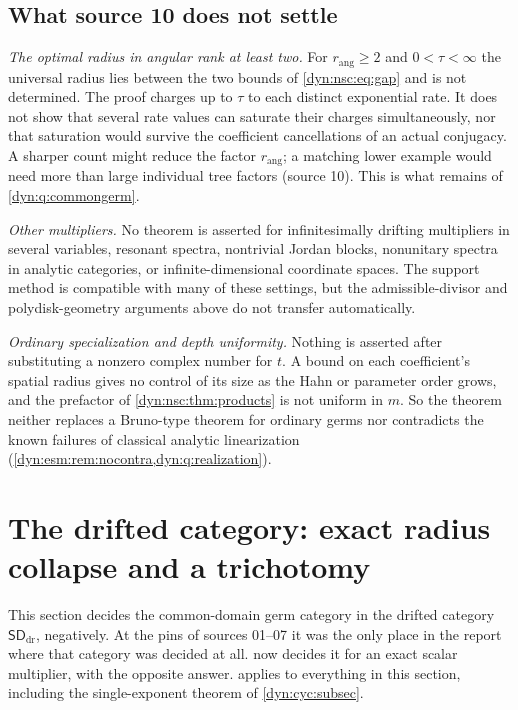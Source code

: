 \documentclass[11pt,letterpaper]{article}
\theoremstyle{definition}
\theoremstyle{remark}
\newcommand{\sddr}{\mathsf{SD}_{\mathrm{dr}}}
\newcommand{\rang}{r_{\mathrm{ang}}}
\numberwithin{equation}{section}
\begin{document}
\subsection{What source 10 does not settle}
\label{dyn:nsc:subsec:limits}

\emph{The optimal radius in angular rank at least two.} For $\rang\ge2$ and
$0<\tau<\infty$ the universal radius lies between the two bounds of
\eqref{dyn:nsc:eq:gap} and is not determined. The proof charges up to
$\tau$ to each distinct exponential rate. It does not show that several rate
values can saturate their charges simultaneously, nor that saturation would
survive the coefficient cancellations of an actual conjugacy. A sharper
count might reduce the factor $\rang$; a matching lower example would need
more than large individual tree factors (source 10). This is what remains of
\cref{dyn:q:commongerm}.

\emph{Other multipliers.} No theorem is asserted for infinitesimally drifting
multipliers in several variables, resonant spectra, nontrivial Jordan
blocks, nonunitary spectra in analytic categories, or infinite-dimensional
coordinate spaces. The support method is compatible with many of these
settings, but the admissible-divisor and polydisk-geometry arguments above
do not transfer automatically.

\emph{Ordinary specialization and depth uniformity.} Nothing is asserted
after substituting a nonzero complex number for $t$. A bound on each
coefficient's spatial radius gives no control of its size as the Hahn or
parameter order grows, and the prefactor of \cref{dyn:nsc:thm:products} is
not uniform in $m$. So the theorem neither replaces a Bruno-type theorem for
ordinary germs nor contradicts the known failures of classical analytic
linearization (\cref{dyn:esm:rem:nocontra,dyn:q:realization}).

\section{The drifted category: exact radius collapse and a trichotomy}
\label{dyn:sec:drift}

This section decides the common-domain germ category in the drifted
category $\sddr$, negatively. At the pins of sources 01--07 it was the only
place in the report where that category was decided at all.
 now decides it for an exact scalar multiplier, with the
opposite answer.  applies to everything in this
section, including the single-exponent theorem of \cref{dyn:cyc:subsec}.
\end{document}
